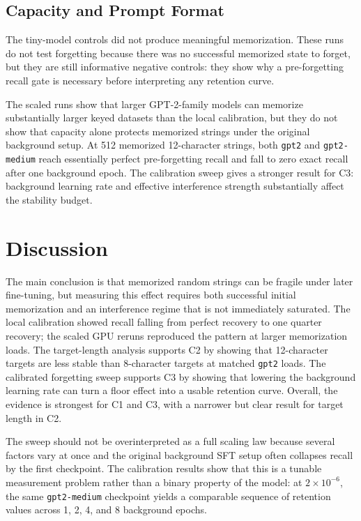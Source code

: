 \documentclass{article}
\begin{document}
\subsection{Capacity and Prompt Format}

The tiny-model controls did not produce meaningful memorization. These runs do not test forgetting because there was no successful memorized state to forget, but they are still informative negative controls: they show why a pre-forgetting recall gate is necessary before interpreting any retention curve.

The scaled runs show that larger GPT-2-family models can memorize substantially larger keyed datasets than the local calibration, but they do not show that capacity alone protects memorized strings under the original background setup. At 512 memorized 12-character strings, both \texttt{gpt2} and \texttt{gpt2-medium} reach essentially perfect pre-forgetting recall and fall to zero exact recall after one background epoch. The calibration sweep gives a stronger result for C3: background learning rate and effective interference strength substantially affect the stability budget.

\section{Discussion}

The main conclusion is that memorized random strings can be fragile under later fine-tuning, but measuring this effect requires both successful initial memorization and an interference regime that is not immediately saturated. The local calibration showed recall falling from perfect recovery to one quarter recovery; the scaled GPU reruns reproduced the pattern at larger memorization loads. The target-length analysis supports C2 by showing that 12-character targets are less stable than 8-character targets at matched \texttt{gpt2} loads. The calibrated forgetting sweep supports C3 by showing that lowering the background learning rate can turn a floor effect into a usable retention curve. Overall, the evidence is strongest for C1 and C3, with a narrower but clear result for target length in C2.

The sweep should not be overinterpreted as a full scaling law because several factors vary at once and the original background SFT setup often collapses recall by the first checkpoint. The calibration results show that this is a tunable measurement problem rather than a binary property of the model: at $2 \times 10^{-6}$, the same \texttt{gpt2-medium} checkpoint yields a comparable sequence of retention values across 1, 2, 4, and 8 background epochs.
\end{document}
